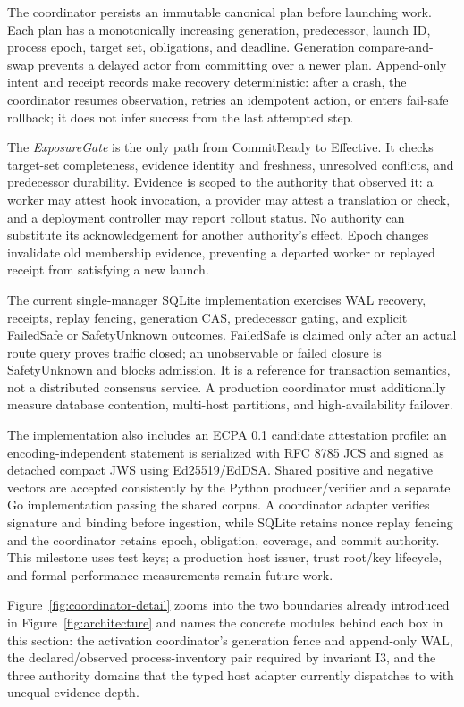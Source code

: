 \documentclass[letterpaper,twocolumn,10pt]{article}
\begin{document}
The coordinator persists an immutable canonical plan before launching work.
Each plan has a monotonically increasing generation, predecessor, launch ID,
process epoch, target set, obligations, and deadline.  Generation
compare-and-swap prevents a delayed actor from committing over a newer plan.
Append-only intent and receipt records make recovery deterministic: after a
crash, the coordinator resumes observation, retries an idempotent action, or
enters fail-safe rollback; it does not infer success from the last attempted
step.

The \emph{ExposureGate} is the only path from CommitReady to Effective.  It
checks target-set completeness, evidence identity and freshness, unresolved
conflicts, and predecessor durability.  Evidence is scoped to the authority
that observed it: a worker may attest hook invocation, a provider may attest a
translation or check, and a deployment controller may report rollout status.
No authority can substitute its acknowledgement for another authority's
effect.  Epoch changes invalidate old membership evidence, preventing a
departed worker or replayed receipt from satisfying a new launch.

The current single-manager SQLite implementation exercises WAL recovery,
receipts, replay fencing, generation CAS, predecessor gating, and explicit
FailedSafe or SafetyUnknown outcomes.  FailedSafe is claimed only after an
actual route query proves traffic closed; an unobservable or failed closure is
SafetyUnknown and blocks admission.  It is a reference for transaction semantics, not a
distributed consensus service.  A production coordinator must additionally
measure database contention, multi-host partitions, and high-availability
failover.

The implementation also includes an ECPA 0.1 candidate attestation profile:
an encoding-independent statement is serialized with RFC 8785 JCS and signed
as detached compact JWS using Ed25519/EdDSA.  Shared positive and negative
vectors are accepted consistently by the Python producer/verifier and a
separate Go implementation passing the shared corpus.  A coordinator adapter
verifies signature and binding
before ingestion, while SQLite retains nonce replay fencing and the coordinator
retains epoch, obligation, coverage, and commit authority.  This milestone uses
test keys; a production host issuer, trust root/key lifecycle, and
formal performance measurements remain future work.

Figure~\ref{fig:coordinator-detail} zooms into the two boundaries already
introduced in Figure~\ref{fig:architecture} and names the concrete modules
behind each box in this section: the activation coordinator's generation
fence and append-only WAL, the declared/observed process-inventory pair
required by invariant I3, and the three authority domains that the typed
host adapter currently dispatches to with unequal evidence depth.
\end{document}
